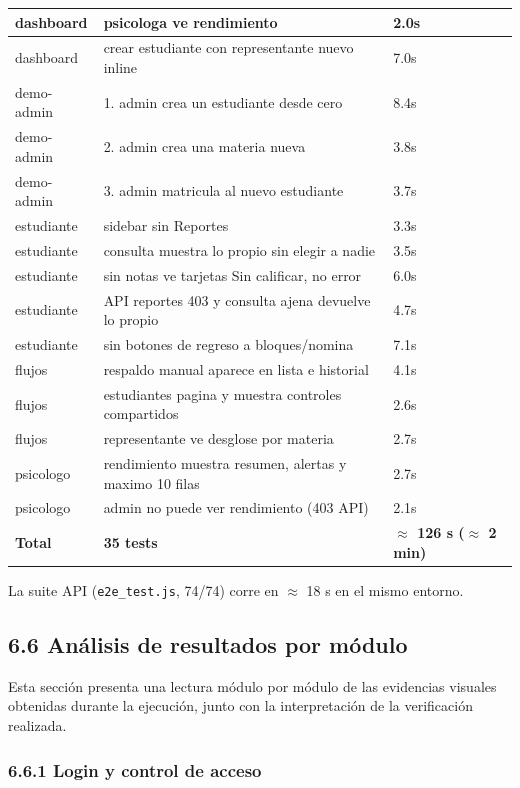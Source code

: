 \documentclass[11pt,a4paper]{article}
\begin{document}
{\begin{longtable}{|p{}|p{}|p{}|}
dashboard & psicologa ve rendimiento & 2.0s \\ \hline
dashboard & crear estudiante con representante nuevo inline & 7.0s \\ \hline
demo-admin & 1. admin crea un estudiante desde cero & 8.4s \\ \hline
demo-admin & 2. admin crea una materia nueva & 3.8s \\ \hline
demo-admin & 3. admin matricula al nuevo estudiante & 3.7s \\ \hline
estudiante & sidebar sin Reportes & 3.3s \\ \hline
estudiante & consulta muestra lo propio sin elegir a nadie & 3.5s \\ \hline
estudiante & sin notas ve tarjetas Sin calificar, no error & 6.0s \\ \hline
estudiante & API reportes 403 y consulta ajena devuelve lo propio & 4.7s \\ \hline
estudiante & sin botones de regreso a bloques/nomina & 7.1s \\ \hline
flujos & respaldo manual aparece en lista e historial & 4.1s \\ \hline
flujos & estudiantes pagina y muestra controles compartidos & 2.6s \\ \hline
flujos & representante ve desglose por materia & 2.7s \\ \hline
psicologo & rendimiento muestra resumen, alertas y maximo 10 filas & 2.7s \\ \hline
psicologo & admin no puede ver rendimiento (403 API) & 2.1s \\ \hline
\textbf{Total} & \textbf{35 tests} & \textbf{{$\approx$} 126 s ({$\approx$} 2 min)} \\ \hline
\end{longtable}}


La suite API (\texttt{e2e\_test.js}, 74/74) corre en {$\approx$} 18 s en el mismo entorno.


\subsection*{6.6 Análisis de resultados por módulo}


Esta sección presenta una lectura módulo por módulo de las evidencias visuales obtenidas durante la ejecución, junto con la interpretación de la verificación realizada.


\subsubsection*{6.6.1 Login y control de acceso}
\end{document}
